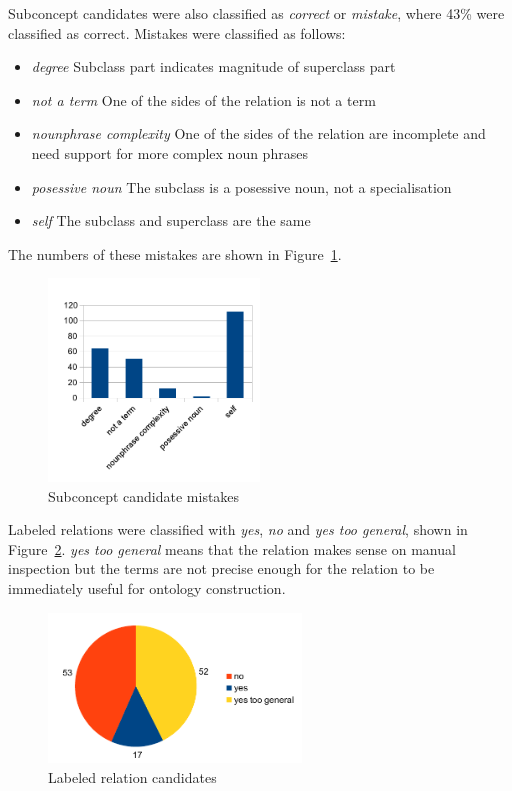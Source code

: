 \documentclass[a4paper]{report}
\begin{document}
Subconcept candidates were also classified as \emph{correct} or \emph{mistake}, where 43\% were classified as correct.
Mistakes were classified as follows:

\begin{itemize}
  \item \emph{degree} Subclass part indicates magnitude of superclass part
  \item \emph{not a term} One of the sides of the relation is not a term
  \item \emph{nounphrase complexity} One of the sides of the relation are incomplete and need support for more complex noun phrases
  \item \emph{posessive noun} The subclass is a posessive noun, not a specialisation
  \item \emph{self} The subclass and superclass are the same
\end{itemize}

The numbers of these mistakes are shown in Figure~\ref{fig:subconcept-cands}.

\begin{figure}
  \centering
  \includegraphics[width=0.5\textwidth]{graphics/subconcepts-mistakes}
  \caption{Subconcept candidate mistakes}
  \label{fig:subconcept-cands}
\end{figure}

Labeled relations were classified with \emph{yes}, \emph{no} and \emph{yes too general}, shown in Figure~\ref{fig:rel-cands}.
\emph{yes too general} means that the relation makes sense on manual inspection but the terms are not precise enough for the relation to be immediately useful for ontology construction.

\begin{figure}
  \centering
  \includegraphics[width=0.6\textwidth]{graphics/labeled-relations}
  \caption{Labeled relation candidates}
  \label{fig:rel-cands}
\end{figure}
\end{document}
